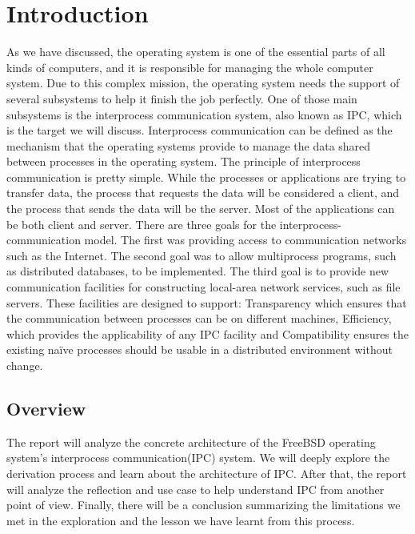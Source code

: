 \documentclass[12pt, dvipsnames, a4paper]{article}
\begin{document}
\section{Introduction}
As we have discussed, the operating system is one of the essential parts of all kinds of computers, and it is responsible for managing the whole computer system. Due to this complex mission, the operating system needs the support of several subsystems to help it finish the job perfectly. One of those main subsystems is the interprocess communication system, also known as IPC, which is the target we will discuss.
Interprocess communication can be defined as the mechanism that the operating systems provide to manage the data shared between processes in the operating system.
The principle of interprocess communication is pretty simple.
While the processes or applications are trying to transfer data, the process that requests the data will be considered a client, and the process that sends the data will be the server.
Most of the applications can be both client and server.
There are three goals for the interprocess-communication model. The first was providing access to communication networks such as the Internet.
The second goal was to allow multiprocess programs, such as distributed databases, to be implemented.
The third goal is to provide new communication facilities for constructing local-area network services, such as file servers. These facilities are designed to support: Transparency which ensures that the communication between processes can be on different machines, Efficiency, which provides the applicability of any IPC facility and Compatibility ensures the existing naïve processes should be usable in a distributed environment without change.

\subsection{Overview}
The report will analyze the concrete architecture of the FreeBSD operating system's interprocess communication(IPC) system.  We will deeply explore the derivation process and learn about the architecture of IPC.
After that, the report will analyze the reflection and use case to help understand IPC from another point of view.
Finally, there will be a conclusion summarizing the limitations we met in the exploration and the lesson we have learnt from this process.
\clearpage
\end{document}
